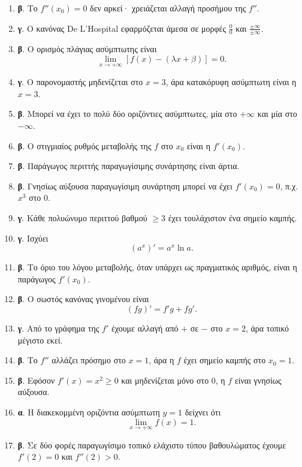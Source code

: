 \begin{enumerate}[label=\textbf{2.\arabic*.}]
\item \textbf{β}. Το $f''(x_0)=0$ δεν αρκεί· χρειάζεται αλλαγή προσήμου της $f''$.
\item \textbf{γ}. Ο κανόνας De L'Hospital εφαρμόζεται άμεσα σε μορφές $\frac00$ και $\frac{\pm\infty}{\pm\infty}$.
\item \textbf{β}. Ο ορισμός πλάγιας ασύμπτωτης είναι
\[
\lim_{x\to+\infty}[f(x)-(\lambda x+\beta)]=0.
\]
\item \textbf{γ}. Ο παρονομαστής μηδενίζεται στο $x=3$, άρα κατακόρυφη ασύμπτωτη είναι η $x=3$.
\item \textbf{β}. Μπορεί να έχει το πολύ δύο οριζόντιες ασύμπτωτες, μία στο $+\infty$ και μία στο $-\infty$.
\item \textbf{β}. Ο στιγμιαίος ρυθμός μεταβολής της $f$ στο $x_0$ είναι η $f'(x_0)$.
\item \textbf{β}. Παράγωγος περιττής παραγωγίσιμης συνάρτησης είναι άρτια.
\item \textbf{β}. Γνησίως αύξουσα παραγωγίσιμη συνάρτηση μπορεί να έχει $f'(x_0)=0$, π.χ. $x^3$ στο $0$.
\item \textbf{γ}. Κάθε πολυώνυμο περιττού βαθμού $\geq3$ έχει τουλάχιστον ένα σημείο καμπής.
\item \textbf{γ}. Ισχύει
\[
(a^x)'=a^x\ln a.
\]
\item \textbf{β}. Το όριο του λόγου μεταβολής, όταν υπάρχει ως πραγματικός αριθμός, είναι η παράγωγος $f'(x_0)$.
\item \textbf{β}. Ο σωστός κανόνας γινομένου είναι
\[
(fg)'=f'g+fg'.
\]
\item \textbf{γ}. Από το γράφημα της $f'$ έχουμε αλλαγή από $+$ σε $-$ στο $x=2$, άρα τοπικό μέγιστο εκεί.
\item \textbf{β}. Το $f''$ αλλάζει πρόσημο στο $x=1$, άρα η $f$ έχει σημείο καμπής στο $x_0=1$.
\item \textbf{β}. Εφόσον $f'(x)=x^2\geq0$ και μηδενίζεται μόνο στο $0$, η $f$ είναι γνησίως αύξουσα.
\item \textbf{α}. Η διακεκομμένη οριζόντια ασύμπτωτη $y=1$ δείχνει ότι
\[
\lim_{x\to+\infty}f(x)=1.
\]
\item \textbf{β}. Σε δύο φορές παραγωγίσιμο τοπικό ελάχιστο τύπου βαθουλώματος έχουμε $f'(2)=0$ και $f''(2)>0$.
\end{enumerate}

